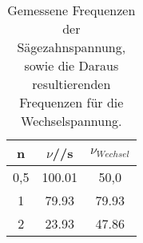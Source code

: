 \begin{table}[H]
  \centering
   \begin{tabular}{c c c}
    \toprule
     n& $\nu$/\; 1/s & $\nu_{Wechsel}$\\
    \midrule
    0,5 & 100.01& 50,0\\
    1 & 79.93 & 79.93\\
    2 & 23.93 & 47.86\\
    \bottomrule
  \end{tabular}
  \caption{Gemessene Frequenzen der Sägezahnspannung, sowie die Daraus resultierenden Frequenzen für die
  Wechselspannung.}
  \label{tab:tab3}
\end{table}
